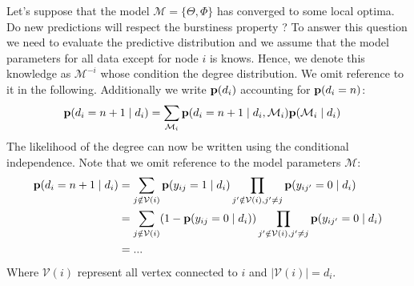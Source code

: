 Let's suppose that the model $\mathcal{M} = \{\Theta, \Phi\}$ has converged to some local optima. Do new predictions will respect the burstiness property ? To answer this question we need to evaluate the predictive distribution and we assume that the model parameters for all data except for node $i$ is knows. Hence, we denote this knowledge as $\mathcal{M}^{-i}$ whose condition the degree distribution. We omit reference to it in the following. Additionally we write $\mathbf{p}(d_i)$ accounting for $\mathbf{p}(d_i=n)$:
\begin{align}
    \mathbf{p}(d_i=n+1 \mid d_i) &= \sum_{\mathcal{M}_i} \mathbf{p}(d_i=n+1 \mid d_i, \mathcal{M}_i) \mathbf{p}(\mathcal{M}_i \mid d_i)
\end{align}
The likelihood of the degree can now be written using the conditional independence. Note that we omit reference to the model parameters $\mathcal{M}$:
\begin{align}
    \mathbf{p}(d_i=n+1 \mid d_i) &= \sum_{j \notin \mathcal{V}(i)} \mathbf{p}(y_{ij} = 1 \mid d_i) \prod_{j'\notin \mathcal{V}(i), j' \neq j} \mathbf{p}(y_{ij'}=0 \mid d_i) \\
    &=  \sum_{j \notin \mathcal{V}(i)} (1 - \mathbf{p}(y_{ij} = 0 \mid d_i) ) \prod_{j'\notin \mathcal{V}(i), j' \neq j} \mathbf{p}(y_{ij'}=0 \mid d_i) \\
    &= ...
\end{align}
Where $\mathcal{V}(i)$ represent all vertex connected to $i$ and $| \mathcal{V}(i) | = d_i$.\\


